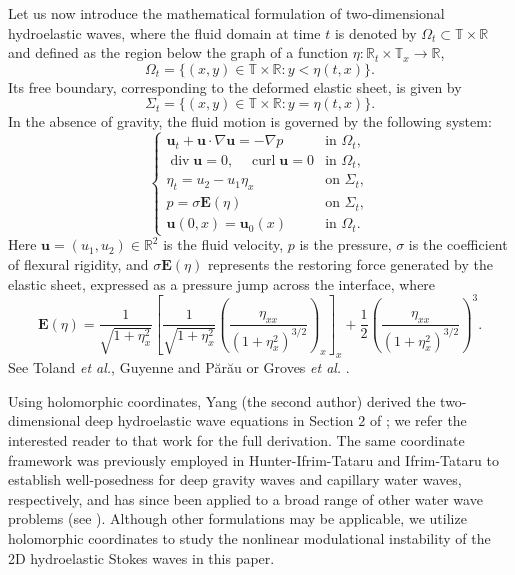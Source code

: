 \documentclass[12pt]{amsart}
\theoremstyle{remark}
\theoremstyle{definition}
\numberwithin{equation}{section}
\newcommand{\T}{\mathbb{T}}
\begin{document}
Let us now introduce the mathematical formulation of two-dimensional hydroelastic waves, where the fluid domain at time $t$ is denoted by $\Omega_t \subset \mathbb{T} \times \mathbb{R}$ and defined as the region below the graph of a function $\eta: \mathbb{R}_t \times \mathbb{T}_x \to \mathbb{R}$,
\[
\Omega_t = \{ (x, y) \in \T\times\mathbb{R} : y < \eta(t, x) \}.
\]
Its free boundary, corresponding to the deformed elastic sheet, is given by
\[
\Sigma_t = \{ (x, y) \in \T \times\mathbb{R} : y = \eta(t, x) \}.
\]
In the absence of gravity, the fluid motion is governed by the following system:
\begin{equation}\label{HWE1}
    \begin{cases}
        \mathbf{u}_t + \mathbf{u} \cdot \nabla \mathbf{u} = -\nabla p & \text{in } \Omega_t, \\
\operatorname{div} \mathbf{u} = 0, \quad \operatorname{curl} \mathbf{u} = 0 & \text{in } \Omega_t, \\
\eta_t=u_2-u_1\eta_x&\text{on } \Sigma_t,\\
        p = \sigma \mathbf{E}(\eta) & \text{on } \Sigma_t, \\
        \mathbf{u}(0, x) = \mathbf{u}_0(x) & \text{in } \Omega_t.
    \end{cases}
\end{equation}
Here $\mathbf{u} = (u_1, u_2) \in \mathbb{R}^2$ is the fluid velocity, $p$ is the pressure, $\sigma$ is the coefficient of flexural rigidity, and $ \sigma\mathbf{E}(\eta)$ represents the restoring force generated by the elastic sheet, expressed as a pressure jump across the interface, where
\begin{equation}\label{Elastic}
    \mathbf{E}(\eta) =\frac{1}{\sqrt{1+\eta_x^2}} 
    \left[ \frac{1}{\sqrt{1+\eta_x^2}} 
    \left( \frac{\eta_{xx}}{(1+\eta_x^2)^{3/2}} \right)_x \right]_x
    + \frac{1}{2} \left( \frac{\eta_{xx}}{(1+\eta_x^2)^{3/2}} \right)^3.
\end{equation}
See Toland \textit{et al.}\cite{MR2413099,MR2812947}, Guyenne and P\u ar\u au \cite{MR3002503} or Groves \textit{et al.} \cite{MR4733013,MR3566507}. 

Using holomorphic coordinates, Yang (the second author) derived the two-dimensional deep hydroelastic wave equations in Section $2$ of \cite{MR4846707}; we refer the interested reader to that work for the full derivation.
The same coordinate framework was previously employed in Hunter-Ifrim-Tataru \cite{MR3535894} and Ifrim-Tataru \cite{MR3667289} to establish well-posedness for deep gravity waves and capillary water waves, respectively, and has since been applied to a broad range of other water wave problems (see \cite{MR3535894, MR3499085, MR3625189, AIT, MR4483135, MR4462478, MR4858219, MR4891579}).
Although other formulations may be applicable, we utilize holomorphic coordinates to study the nonlinear modulational instability of the 2D hydroelastic Stokes waves in this paper.
\end{document}
